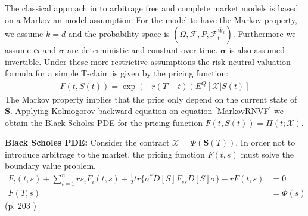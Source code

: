 The classical approach in \parencite{B-S-Paper} to arbitrage free and complete market models is based on a Markovian model assumption. For the model to have the Markov property, we assume $k=d$ and the probability space is $(\Omega, \mathcal{F}, P, \mathcal{F}_t^{\bar{W}_t})$. Furthermore we assume $\bm{\alpha}$ and $\bm{\sigma}$ are deterministic and constant over time. $\bm{\sigma}$ is also assumed invertible. Under these more restrictive assumptions the risk neutral valuation formula for a simple T-claim is given by the pricing function:
\begin{align}\label{MarkovRNVF}
F(t,S(t))=\exp(-r(T-t))E^Q[\mathcal{X}|S(t)]
\end{align}
The Markov property implies that the price only depend on the current state of $\bm{S}$. Applying Kolmogorov backward equation on equation \eqref{MarkovRNVF} we obtain the Black-Scholes PDE for the pricing function $F(t,S(t))=\Pi(t; \mathcal{X})$.

\begin{theorem}\label{BSPDEMultiDim}
\textbf{Black Scholes PDE: } Consider the contract $\mathcal{X}=\Phi(\bm{S}(T))$. In order not to introduce arbitrage to the market, the pricing function $F(t,s)$ must solve the boundary value problem.
\begin{equation*}
\begin{split}
F_t(t,s)+\sum_{i=1}^{n} rs_iF_i(t,s)+\frac{1}{2} tr\{\sigma^* D[S] F_{ss} D[S] \sigma\} -rF(t,s)&=0\\
F(T,s)&=\Phi(s)
\end{split}
\end{equation*}
\null \hfill (p. 203 \parencite{finKont})
\end{theorem}


